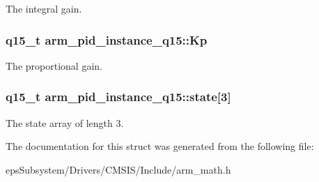 The integral gain. \hypertarget{structarm__pid__instance__q15_ad228aae24a1b6d855c93a8b9bbc1c4f1}{
\subsubsection[{Kp}]{\setlength{\rightskip}{0pt plus 5cm}q15\-\_\-t arm\-\_\-pid\-\_\-instance\-\_\-q15\-::\-Kp}}\label{structarm__pid__instance__q15_ad228aae24a1b6d855c93a8b9bbc1c4f1}
The proportional gain. \hypertarget{structarm__pid__instance__q15_a4a3f0a878b5b6b055e3478a2f244cd30}{
\subsubsection[{state}]{\setlength{\rightskip}{0pt plus 5cm}q15\-\_\-t arm\-\_\-pid\-\_\-instance\-\_\-q15\-::state\mbox{[}3\mbox{]}}}\label{structarm__pid__instance__q15_a4a3f0a878b5b6b055e3478a2f244cd30}
The state array of length 3. 

The documentation for this struct was generated from the following file\-:\begin{DoxyCompactItemize}
\item 
eps\-Subsystem/\-Drivers/\-C\-M\-S\-I\-S/\-Include/arm\-\_\-math.\-h\end{DoxyCompactItemize}
